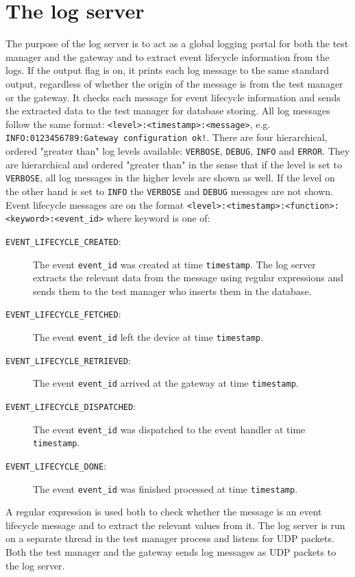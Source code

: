 \section{The log server}
\label{sec:log_server}

The purpose of the log server is to act as a global logging portal for both the
test manager and the gateway and to extract event lifecycle information from
the logs. If the output flag is on, it prints each log message to the same
standard output, regardless of whether the origin of the message is from the
test manager or the gateway. It checks each message for event lifecycle
information and sends the extracted data to the test manager for database
storing. All log messages follow the same format:
\texttt{<level>:<timestamp>:<message>}, e.g. \texttt{INFO:0123456789:Gateway
configuration ok!}. There are four hierarchical, ordered "greater than" log
levels available: \texttt{VERBOSE}, \texttt{DEBUG}, \texttt{INFO} and
\texttt{ERROR}. They are hierarchical and ordered "greater than" in the sense
that if the level is set to \texttt{VERBOSE}, all log messages in the higher
levels are shown as well. If the level on the other hand is set to
\texttt{INFO} the \texttt{VERBOSE} and \texttt{DEBUG} messages are not shown.
Event lifecycle messages are on the format
\texttt{<level>:<timestamp>:<function>:<keyword>:<event\_id>} where keyword is
one of:

\begin{description}

\item[\texttt{EVENT\_LIFECYCLE\_CREATED}:] The event \texttt{event\_id} was
created at time \texttt{timestamp}. The log server extracts the relevant data
from the message using regular expressions and sends them to the test manager
who inserts them in the database.

\item[\texttt{EVENT\_LIFECYCLE\_FETCHED}:] The event \texttt{event\_id} left
the device at time \texttt{timestamp}.

\item[\texttt{EVENT\_LIFECYCLE\_RETRIEVED}:] The event \texttt{event\_id}
arrived at the gateway at time \texttt{timestamp}.

\item[\texttt{EVENT\_LIFECYCLE\_DISPATCHED}:] The event \texttt{event\_id} was
dispatched to the event handler at time \texttt{timestamp}.

\item[\texttt{EVENT\_LIFECYCLE\_DONE}:] The event \texttt{event\_id} was
finished processed at time \texttt{timestamp}.

\end{description}

A regular expression is used both to check whether the message is an event
lifecycle message and to extract the relevant values from it. The log server is
run on a separate thread in the test manager process and listens for UDP
packets. Both the test manager and the gateway sends log messages as UDP
packets to the log server.

